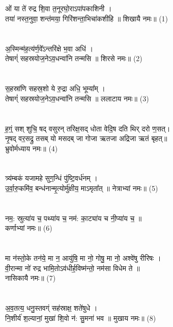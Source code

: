 \subsection{}
ओं या ते॑ रुद्र शि॒वा त॒नूरघो॒राऽपा॑पकाशिनी ।\\
तया॑ नस्त॒नुवा॒ शन्त॑मया॒ गिरि॑शन्ता॒भिचा॑कशीहि ॥ शिखायै नमः॥ (1)\\
{\small{}}\\
\\
अ॒स्मिन्म॑ह॒त्य॑र्ण॒वे᳚ऽन्तरि॑क्षे भ॒वा अधि॑ ।\\
तेषाग्ं॑ सहस्रयोज॒नेऽव॒धन्वा॑नि तन्मसि ॥ शिरसे नमः॥ (2)\\
{\small{}}\\
\\
स॒हस्रा॑णि सहस्र॒शो ये रु॒द्रा अधि॒ भूम्या᳚म् ।\\
तेषाग्ं॑ सहस्रयोज॒नेऽव॒धन्वा॑नि तन्मसि ॥ ललाटाय नमः॥ (3)\\
{\small{}}\\
\\
ह॒ग्ं॒ सश् शुचि॒ षद् वसुरन् तरिक्ष॒सद् धोता वेदि॒ष दति थिर् दरो ण॒सत्।\\
नृ॒षद् वर॒सद्रु तसब् यो मसदब् जा गोजा ऋतजा अद्रिजा ऋतं बृहत्॥ \\
भ्रुवोर्मध्याय नमः॥ (4)\\
{\small{}}\\
\\
त्र्य॑म्बकं यजामहे सुग॒न्धिं पु॑ष्टि॒वर्ध॑नम् ।\\
उ॒र्वा॒रु॒कमि॑व॒ बन्ध॑नान्मृ॒त्योर्मु॑क्षीय॒ माऽमृता᳚त् ॥  नेत्राभ्यां नमः॥ (5)\\
{\small{}}\\
\\
नम॒: स्रुत्या॑य च॒ पथ्या॑य च॒    नम॑: का॒ट्या॑य च नी॒प्या॑य च॒ ॥ \\
कर्णाभ्यां नमः॥ (6)\\
{\small{}}\\
\\
मा न॑स्तो॒के तन॑ये॒ मा न॒ आयु॑षि॒ मा नो॒ गोषु॒ मा नो॒ अश्वे॑षु रीरिषः ।\\
वी॒रान्मा नो॑ रुद्र भामि॒तोऽव॑धीर्ह॒विष्म॑न्तो॒  नम॑सा विधेम ते ॥  \\
नासिकायै नमः॥ (7)\\
{\small{}}\\
\\
अ॒व॒तत्य॒ धनु॒स्तवग्ं सह॑स्राक्ष॒ शते॑षुधे ।\\
नि॒शीर्य॑ श॒ल्यानां॒ मुखा॑ शि॒वो न॑: सु॒मना॑ भव ॥ मुखाय नमः॥ (8)\\
